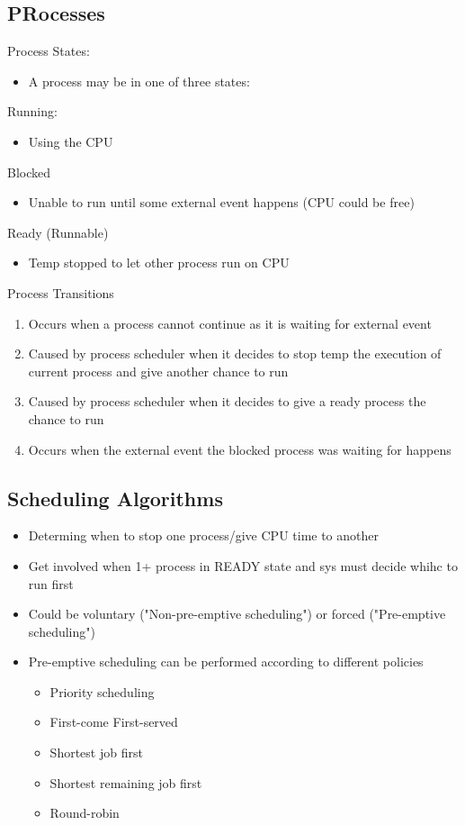 \subsection{PRocesses}

Process States:
\begin{itemize}
	\item A process may be in one of three states:
\end{itemize}

Running:
\begin{itemize}
	\item Using the CPU
\end{itemize}

Blocked
\begin{itemize}
	\item Unable to run until some external event happens (CPU could be
		free)
\end{itemize}

Ready (Runnable)
\begin{itemize}
	\item Temp stopped to let other process run on CPU
\end{itemize}

Process Transitions
\begin{enumerate}
	\item Occurs when a process cannot continue as it is waiting for
		external event
	\item Caused by process scheduler when it decides to stop temp the
		execution of current process and give another chance to run
	\item Caused by process scheduler when it decides to give a ready
		process the chance to run
	\item Occurs when the external event the blocked process was waiting
		for happens
\end{enumerate}

\subsection{Scheduling Algorithms}

\begin{itemize}
	\item Determing when to stop one process/give CPU time to another
	\item Get involved when 1+ process in READY state and sys must decide
		whihc to run first
	\item Could be voluntary ("Non-pre-emptive scheduling") or forced
		("Pre-emptive scheduling")
	\item Pre-emptive scheduling can be performed according to different
		policies
	\begin{itemize}
		\item Priority scheduling
		\item First-come First-served
		\item Shortest job first
		\item Shortest remaining job first
		\item Round-robin
	\end{itemize}
\end{itemize}

